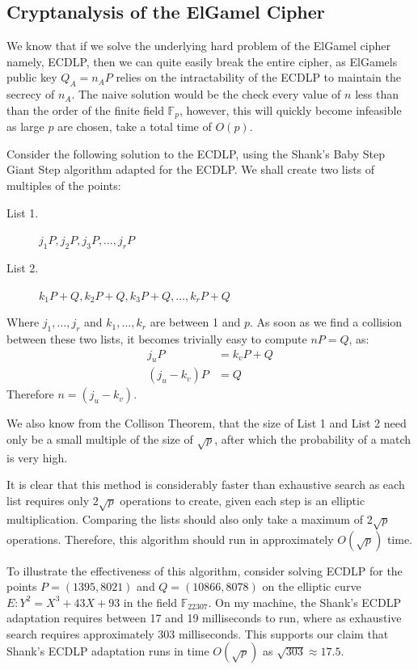 \documentclass[12pt, a4paper, final]{report}
\begin{document}
\subsection{Cryptanalysis of the ElGamel Cipher}

We know that if we solve the underlying hard problem of the ElGamel cipher
namely, ECDLP, then we can quite easily break the entire cipher, as ElGamels
public key $Q_A = n_AP$ relies on the intractability of the ECDLP to maintain
the secrecy of $n_A$. The naive solution would be the check every value of
$n$ less than than the order of the finite field $\mathds{F}_p$, however, this
will quickly become infeasible as large $p$ are chosen, take a total time of
$O(p)$.

Consider the following solution to the ECDLP, using the Shank's Baby Step
Giant Step algorithm adapted for the ECDLP. We shall create two lists of
multiples of the points:
\begin{description}
    \item[\quad List 1.] \quad $j_1P, j_2P, j_3P, \ldots, j_rP$
    \item[\quad List 2.] \quad $k_1P + Q, k_2P + Q, k_3P + Q, \ldots, k_rP + Q$
\end{description}
Where $j_1, \ldots, j_r$ and $k_1, \ldots, k_r$ are between 1 and $p$.
As soon as we find a collision between these two lists, it becomes trivially
easy to compute $nP = Q$, as:
\begin{align*}
    j_uP &= k_vP + Q\\
    (j_u - k_v)P &= Q
\end{align*}
Therefore $n = (j_u - k_v)$.

We also know from the Collison Theorem, that the size of List 1 and List 2 need
only be a small multiple of the size of $\sqrt{p}$, after which the probability
of a match is very high.

It is clear that this method is considerably faster than exhaustive search as
each list requires only $2\sqrt{p}$ operations to create, given each step is an
elliptic multiplication. Comparing the lists should also only take a maximum of
$2\sqrt{p}$ operations. Therefore, this algorithm should run in approximately
$O(\sqrt{p})$ time.

To illustrate the effectiveness of this algorithm, consider solving ECDLP
for the points $P = (1395, 8021)$ and $Q = (10866, 8078)$ on the elliptic curve
$E:Y^2 = X^3 + 43X + 93$ in the field $\mathds{F}_{22307}$. On my machine,
the Shank's ECDLP adaptation requires between 17 and 19 milliseconds to run,
where as exhaustive search requires approximately 303 milliseconds. This supports
our claim that Shank's ECDLP adaptation runs in time $O(\sqrt{p})$ as
$\sqrt{303} \approx 17.5$.
\end{document}
